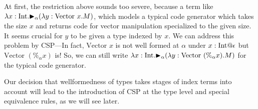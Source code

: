 At first, the restriction above sounds too severe, because a term like
\(\lambda x:\textrm{Int}. {\mathop{\blacktriangleright}}_\alpha (\lambda y:\text{Vector }x.M) \), which
models a typical code generator which takes the size $x$ and returns
code for vector manipulation specialized to the given size.  It seems
crucial for \(y\) to be given a type indexed by $x$.  We can address
this problem by CSP---In fact,
$\text{Vector }x$ is not well formed at $\alpha$ under $x:\I@\epsilon$
but $\text{Vector }(\%_\alpha x)$ is!  So, we can still write
\(\lambda x:\textrm{Int}. {\mathop{\blacktriangleright}}_\alpha (\lambda y:\text{Vector }(\%_\alpha x).M) \)
for the typical code generator.

Our decision that wellformedness of types takes stages of index terms
into account will lead to the introduction of CSP at the type level
and special equivalence rules, as we will see later.
